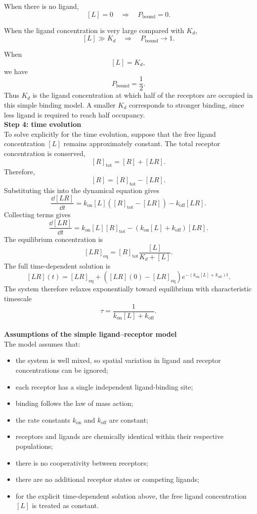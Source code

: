 When there is no ligand,
\[
    [L]=0 \quad \Rightarrow \quad P_{\mathrm{bound}}=0.
\]

When the ligand concentration is very large compared with $K_d$,
\[
    [L]\gg K_d \quad \Rightarrow \quad P_{\mathrm{bound}}\rightarrow1.
\]

When
\[
    [L]=K_d,
\]
we have
\[
    P_{\mathrm{bound}} = \frac{1}{2}.
\]
Thus $K_d$ is the ligand concentration at which half of the receptors are occupied in this simple binding model.
A smaller $K_d$ corresponds to stronger binding, since less ligand is required to reach half occupancy.
% 
% 
\medskip
\\
\textbf{Step 4: time evolution}
\\
To solve explicitly for the time evolution, suppose that the free ligand concentration $[L]$ remains approximately constant.
The total receptor concentration is conserved,
\[
    [R]_{\mathrm{tot}} = [R]+[LR].
\]
Therefore,
\[
    [R] = [R]_{\mathrm{tot}}-[LR].
\]
Substituting this into the dynamical equation gives
\[
    \frac{\dd[LR]}{\dd t} = k_{\mathrm{on}}[L]\left([R]_{\mathrm{tot}}-[LR]\right)-k_{\mathrm{off}}[LR].
\]
Collecting terms gives
\[
    \frac{\dd[LR]}{\dd t} = k_{\mathrm{on}}[L][R]_{\mathrm{tot}}-\left(k_{\mathrm{on}}[L]+k_{\mathrm{off}}\right)[LR].
\]
The equilibrium concentration is
\[
    [LR]_{\mathrm{eq}} = [R]_{\mathrm{tot}}\frac{[L]}{K_d+[L]}.
\]
The full time-dependent solution is
\[
    [LR](t) = [LR]_{\mathrm{eq}} + \left([LR](0)-[LR]_{\mathrm{eq}}\right)e^{-\left(k_{\mathrm{on}}[L]+k_{\mathrm{off}}\right)t}.
\]
The system therefore relaxes exponentially toward equilibrium with characteristic timescale
\[
    \tau = \frac{1}{k_{\mathrm{on}}[L]+k_{\mathrm{off}}}.
\]
% 
% 
\medskip
\\
\textbf{Assumptions of the simple ligand--receptor model}
\\
The model assumes that:
\begin{itemize}
    \item the system is well mixed, so spatial variation in ligand and receptor concentrations can be ignored;
    \item each receptor has a single independent ligand-binding site;
    \item binding follows the law of mass action;
    \item the rate constants $k_{\mathrm{on}}$ and $k_{\mathrm{off}}$ are constant;
    \item receptors and ligands are chemically identical within their respective populations;
    \item there is no cooperativity between receptors;
    \item there are no additional receptor states or competing ligands;
    \item for the explicit time-dependent solution above, the free ligand concentration $[L]$ is treated as constant.
\end{itemize}


